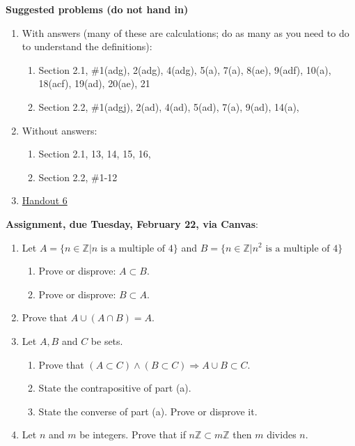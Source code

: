 \documentclass[12pt]{article}
\newcommand{\Z}{{\mathbb Z}}
\begin{document}
\noindent \textbf{Suggested problems (do not hand in)}


\begin{enumerate}
\item With answers (many of these are calculations; do as many as you need to do to understand the definitions):
 \begin{enumerate}
 \item Section 2.1, \#1(adg), 2(adg), 4(adg), 5(a), 7(a), 8(ae), 9(adf), 10(a), 18(acf), 19(ad), 20(ae), 21
 \item Section 2.2, \#1(adgj), 2(ad), 4(ad), 5(ad), 7(a), 9(ad), 14(a),
\end{enumerate}

\item Without answers:
 \begin{enumerate}
 \item Section 2.1, 13, 14, 15, 16, 
 \item Section 2.2, \#1-12
 \end{enumerate}

\item \href{https://www.math.emory.edu/~dzb/teaching/250Fall2021/handouts/250-H06-sets-I.pdf}{Handout 6}
\end{enumerate}

\noindent \textbf{Assignment, due Tuesday, February 22, via Canvas}:
\begin{enumerate}
\item Let $A = \{ n \in \Z | n \text{ is a multiple of } 4\}$ and $B = \{ n \in \Z | n^2 \text{ is a multiple of } 4\}$ 
 \begin{enumerate}
 \item Prove or disprove: $A \subset B$. 
 \item Prove or disprove: $B \subset A$. 
 \end{enumerate}

\item Prove that $A \cup (A \cap B) = A.$
\item Let $A,B$ and $C$ be sets. 
 \begin{enumerate}
 \item Prove that $(A \subset C) \wedge (B \subset C) \Rightarrow A \cup B \subset C$.
 \item State the contrapositive of part (a).
 \item State the converse of part (a). Prove or disprove it.
 \end{enumerate}
\item Let $n$ and $m$ be integers. Prove that if $n\Z \subset m\Z$ then $m$ divides $n$.
\end{enumerate}
\end{document}
